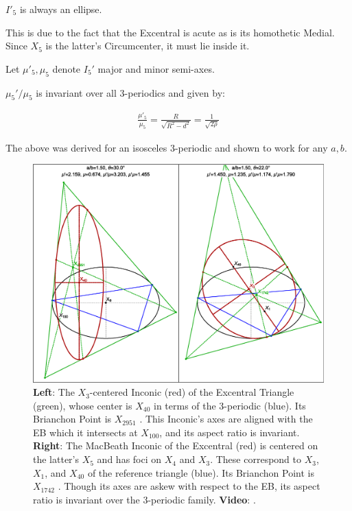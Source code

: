\begin{remark}
$I'_5$ is always an ellipse.
\end{remark}

This is due to the fact that the Excentral is acute as is its homothetic Medial. Since $X_5$ is the latter's Circumcenter, it must lie inside it.

\noindent Let $\mu'_5,\mu_5$ denote $I_5'$ major and minor semi-axes.

\begin{conjecture}
$\mu_5'/\mu_5$ is invariant over all 3-periodics and given by:

\begin{align*}
 \frac{\mu'_5}{\mu_5} =
\frac{R}{\sqrt{R^2-d^2}}=\frac{1}{\sqrt{2 \rho}}
\end{align*}
\label{conj:excIncX5}
\end{conjecture}

The above was derived for an isosceles 3-periodic and shown to work for any $a,b$.

\begin{figure}
    \centering
    \includegraphics[width=\textwidth]{pics_eps_new/0150_two_inconics.eps}
    \caption{\textbf{Left}: The $X_{3}$-centered Inconic (red) of the Excentral Triangle (green), whose center is $X_{40}$ in terms of the 3-periodic (blue). Its Brianchon Point is $X_{2951}$ \cite{moses2020-private-circumconic}. This Inconic's axes are aligned with the EB which it intersects at $X_{100}$, and its aspect ratio is invariant. \textbf{Right}: The MacBeath Inconic of the Excentral (red) is centered on the latter's $X_5$ and has foci on $X_4$ and $X_3$. These correspond to  $X_3$, $X_1$, and $X_{40}$ of the reference triangle (blue). Its Brianchon Point is $X_{1742}$ \cite{moses2020-private-circumconic}. Though its axes are askew with respect to the EB, its aspect ratio is invariant over the 3-periodic family. \textbf{Video}: \cite[PL\#11]{reznik2020-playlist-circum}.}
    \label{fig:macbeath-excentral}
\end{figure}
